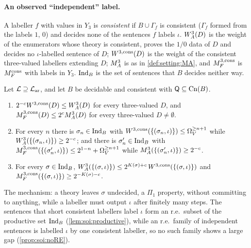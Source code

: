 \paragraph{An observed ``independent'' label.} A labeller $f$ with values in $Y_3$ is \emph{consistent} if $B\cup\Gamma_f$ is consistent ($\Gamma_f$ formed from the labels $1$, $0$) and decides none of the sentences $f$ labels $\iota$. $W_{A}^{3}(D)$ is the weight of the enumerators whose theory is consistent, proves the $1/0$ data of $D$ and decides no $\iota$-labelled sentence of $D$; $W^{3,\mathrm{cons}}(D)$ is the weight of the consistent three-valued labellers extending $D$; $M_{A}^{3}$ is as in \cref{def:setting:MA}, and $M_{F}^{3,\mathrm{cons}}$ is $M_{F}^{\mathrm{cons}}$ with labels in $Y_3$. $\mathrm{Ind}_{B}$ is the set of sentences that $B$ decides neither way.

\begin{proposition}\label{prop:soi:independent}
Let $\mathcal L\supseteq\mathcal{L}_{\mathrm{ar}}$, and let $B$ be decidable and consistent with $\mathsf{Q}\subseteq\mathrm{Cn}(B)$.
\begin{enumerate}[label=(\alph*),leftmargin=*]
\item $2^{-c}W^{3,\mathrm{cons}}(D)\le W_{A}^{3}(D)$ for every three-valued $D$, and $M_{F}^{3,\mathrm{cons}}(D)\le2^cM_{A}^{3}(D)$ for every three-valued $D\ne\emptyset$.
\item For every $n$ there is $\sigma_n\in\mathrm{Ind}_{B}$ with $W^{3,\mathrm{cons}}(\{(\sigma_n,\iota)\})\le\Omega_{V}^{\ge n+1}$ while $W_{A}^{3}(\{(\sigma_n,\iota)\})\ge2^{-c}$; and there is $\sigma'_n\in\mathrm{Ind}_{B}$ with $M_{F}^{3,\mathrm{cons}}(\{(\sigma'_n,\iota)\})\le2^{1-n}+\Omega_{V}^{\ge n+1}$ while $M_{A}^{3}(\{(\sigma'_n,\iota)\})\ge2^{-c}$.
\item For every $\sigma\in\mathrm{Ind}_{B}$, $W_{A}^{3}(\{(\sigma,\iota)\})\le2^{K(\sigma)+c}\,W^{3,\mathrm{cons}}(\{(\sigma,\iota)\})$ and $M_{F}^{3,\mathrm{cons}}(\{(\sigma,\iota)\})\ge2^{-K(\sigma)-c}$.
\end{enumerate}
\end{proposition}

The mechanism: a theory leaves $\sigma$ undecided, a $\Pi_1$ property, without committing to anything, while a labeller must output $\iota$ after finitely many steps. The sentences that short consistent labellers label $\iota$ form an r.e.\ subset of the productive set $\mathrm{Ind}_{B}$ (\cref{lem:soi:productive}), while an r.e.\ family of independent sentences is labelled $\iota$ by one consistent labeller, so no such family shows a large gap (\cref{prop:soi:noRE}).

